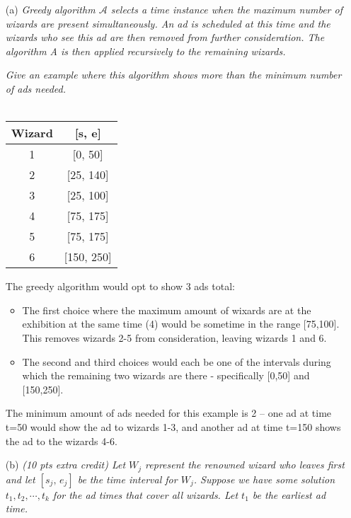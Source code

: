 \documentclass[12pt]{article}
\begin{document}
\begin{enumerate}
\item[(a)] \textit{Greedy algorithm $\mathcal{A}$ selects a time instance when the maximum number of wizards are present simultaneously. An ad is scheduled at this time and the wizards who
see this ad are then removed from further consideration. The algorithm A is then
applied recursively to the remaining wizards.}

\textit {Give an example where this algorithm shows more than the minimum number of
ads needed.}
\\\\
\begin{center}
\centering
\begin{tabular}{c|c}
  Wizard & [s, e] \\
  \hline
  1 & [0, 50] \\
  2 & [25, 140] \\
  3 & [25, 100] \\
  4 & [75, 175] \\
  5 & [75, 175] \\
  6 & [150, 250]
\end{tabular}
\end{center}

The greedy algorithm would opt to show 3 ads total: \\
\begin{itemize}
  \item The first choice where the maximum amount of wixards are at the exhibition at the same time (4) would be sometime in the range [75,100]. This removes wizards 2-5 from consideration, leaving wizards 1 and 6. 
  \item The second and third choices would each be one of the intervals during which the remaining two wizards are there - specifically [0,50] and [150,250].  
\end{itemize}


The minimum amount of ads needed for this example is 2 -- one ad at time t=50 would show the ad to wizards 1-3, and another ad at time t=150 shows the ad to the wizards 4-6.

\pagebreak

\item[(b)]\textit{(10 pts extra credit) Let $W_j$ represent the renowned wizard who leaves first and
let $[s_ j,\,e _j]$ be the time interval for $W_j$. Suppose we have some solution $t_1, t_ 2, \cdots, t_k$ for the ad times that cover all wizards. Let $t_1$ be the earliest ad time.}


\end{enumerate}
\end{document}
